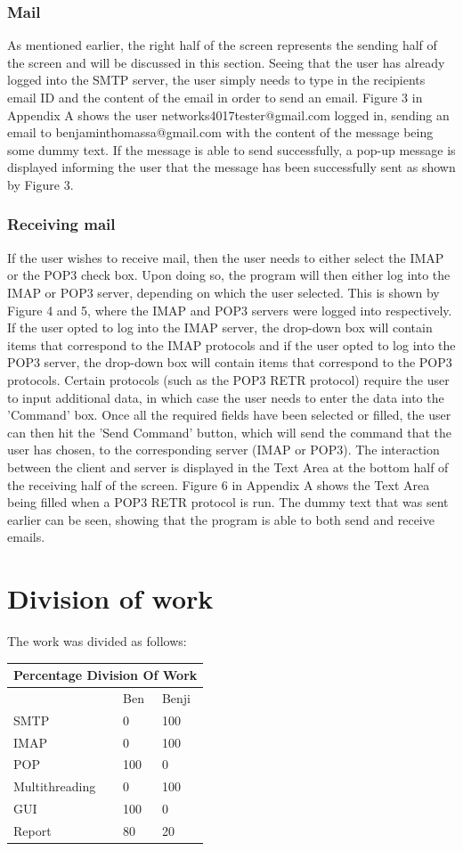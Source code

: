 \documentclass[11pt]{article}
\begin{document}
\begin{multicols}{2}
\subsubsection{Mail}
As mentioned earlier, the right half of the screen represents the sending half of the screen and will be discussed in this section. Seeing that the user has already logged into the SMTP server, the user simply needs to type in the recipients email ID and the content of the email in order to send an email. Figure 3 in Appendix A shows the user networks4017tester@gmail.com logged in, sending an email to benjaminthomassa@gmail.com with the content of the message being some dummy text. If the message is able to send successfully, a pop-up message is displayed informing the user that the message has been successfully sent as shown by Figure 3.
\subsubsection{Receiving mail}
If the user wishes to receive mail, then the user needs to either select the IMAP or the POP3 check box. Upon doing so, the program will then either log into the IMAP or POP3 server, depending on which the user selected. This is shown by Figure 4 and 5, where the IMAP and POP3 servers were logged into respectively. If the user opted to log into the IMAP server, the drop-down box will contain items that correspond to the IMAP protocols and if the user opted to log into the POP3 server, the drop-down box will contain items that correspond to the POP3 protocols. Certain protocols (such as the POP3 RETR protocol) require the user to input additional data, in which case the user needs to enter the data into the 'Command' box. Once all the required fields have been selected or filled, the user can then hit the 'Send Command' button, which will send the command that the user has chosen, to the corresponding server (IMAP or POP3). The interaction between the client and server is displayed in the Text Area at the bottom half of the receiving half of the screen. Figure 6 in Appendix A shows the Text Area being filled when a POP3 RETR protocol is run. The dummy text that was sent earlier can be seen, showing that the program is able to both send and receive emails.
\section{Division of work}
The work was divided as follows:\\
\break{}
\begin{tabular}{ |p{3cm}||p{1.5cm}|p{1.5cm}|}
 \hline
 \multicolumn{3}{|c|}{Percentage Division Of Work} \\
 \hline
  & Ben & Benji\\
 \hline
 SMTP & 0 & 100\\
 IMAP & 0 & 100\\
 POP & 100 & 0\\
 Multithreading & 0 & 100\\
 GUI & 100 & 0\\
 Report & 80 & 20\\
 \hline
\end{tabular}


\end{multicols}
\end{document}
